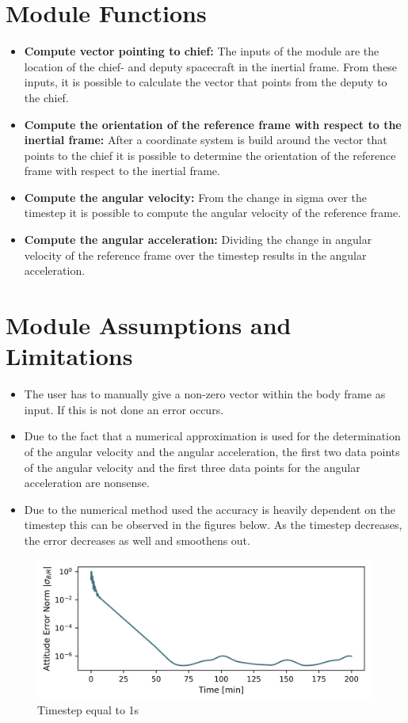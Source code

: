 \documentclass[]{AVSreport}
\begin{document}
\section{Module Functions}

\begin{itemize}
    \item \textbf{Compute vector pointing to chief:} The inputs of the module are the location of the chief- and deputy spacecraft in the inertial frame. From these inputs, it is possible to calculate the vector that points from the deputy to the chief.
    \item \textbf{Compute the orientation of the reference frame with respect to the inertial frame:} After a coordinate system is build around the vector that points to the chief it is possible to determine the orientation of the reference frame with respect to the inertial frame.
    \item \textbf{Compute the angular velocity:} From the change in sigma over the timestep it is possible to compute the angular velocity of the reference frame.
    \item \textbf{Compute the angular acceleration:} Dividing the change in angular velocity of the reference frame over the timestep results in the angular acceleration.
\end{itemize}

\section{Module Assumptions and Limitations}

\begin{itemize}
    \item The user has to manually give a non-zero vector within the body frame as input. If this is not done an error occurs.
    \item Due to the fact that a numerical approximation is used for the determination of the angular velocity and the angular acceleration, the first two data points of the angular velocity and the first three data points for the angular acceleration are nonsense.
    \item Due to the numerical method used the accuracy is heavily dependent on the timestep this can be observed in the figures below. As the timestep decreases, the error decreases as well and smoothens out.
\end{itemize}

\begin{figure}[htb]
	\centerline{
	\includegraphics[scale=0.3]{Figures/att_norm1.png}
	}
	\caption{Timestep equal to 1s}
\end{figure}
\end{document}
